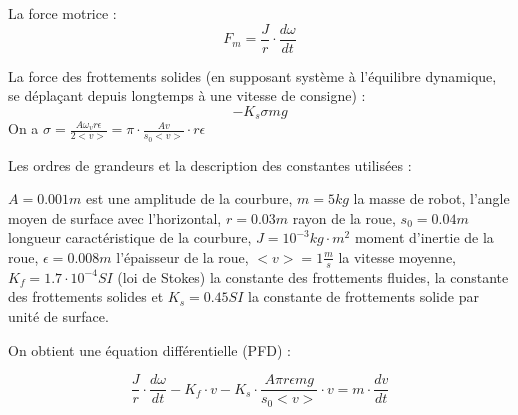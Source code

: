 \documentclass[11pt]{article} %
\begin{document}
La force motrice : \begin{equation} F_m = \frac{J}{r} \cdot \frac{d\omega}{dt}\end{equation} 

La force des frottements solides (en supposant système à l'équilibre dynamique, se déplaçant depuis longtemps à une vitesse de consigne) : \begin{equation} -K_s \sigma mg  \end{equation}
On a \begin{math}  \sigma =\frac{A \omega_v r \epsilon}{2<v>} = \pi \cdot \frac{Av}{s_0<v>} \cdot r \epsilon \end{math}

Les ordres de grandeurs et la description des constantes utilisées : 

\begin{math} A = 0.001m \end{math} est une amplitude de la courbure,  \begin{math} m=5kg \end{math} la masse de robot, l'angle moyen de surface avec l'horizontal, \begin{math} r=0.03m \end{math} rayon de la roue, \begin{math} s_0=0.04m \end{math} longueur caractéristique de la courbure, \begin{math} J = 10^{-3} kg \cdot m^2 \end{math} moment d'inertie de la roue, \begin{math} \epsilon  = 0.008m \end{math} l'épaisseur de la roue, \begin{math} <v>=1 \frac{m}{s} \end{math} la vitesse moyenne, \begin{math} K_f = 1.7 \cdot 10^{-4} SI \end{math} (loi de Stokes) la constante des frottements fluides, la constante des frottements solides et \begin{math} K_s = 0.45 SI \end{math} la constante de frottements solide par unité de surface.

On obtient une équation différentielle (PFD) :

\begin{equation} \frac{J}{r} \cdot \frac{d\omega}{dt} - K_f \cdot v - K_s \cdot  \frac{A\pi r \epsilon mg}{s_0<v>}  \cdot v = m \cdot \frac{dv}{dt}\end{equation}
\end{document}
